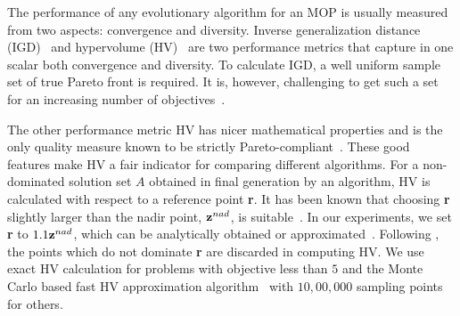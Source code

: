 \documentclass[review]{elsarticle}
\begin{document}
The performance of any evolutionary  algorithm for an MOP is usually measured from two aspects: convergence and diversity. Inverse generalization distance (IGD)~\citep{zitzler2003performance} and hypervolume (HV)~\citep{zitzler1999multiobjective} are two performance metrics that capture in one scalar both convergence and diversity. 
To calculate IGD, a well uniform sample set of true Pareto front is required. It is, however, challenging to get such a set for an increasing number of objectives~\citep{xinyao6883177}. %

The other performance metric HV has nicer mathematical properties  and is the only quality measure known to be strictly Pareto-compliant~\citep{zitzler2003performance}.
These good features make HV a fair indicator for comparing different algorithms. For a non-dominated solution set $A$ obtained in final generation by an algorithm, HV is calculated with respect to a reference point {\bf r}.
%
\noindent It has been known that choosing {\bf r} slightly larger than the nadir point, ${\bf z}^{nad}$, is suitable~\citep{ishibuchi2010many}. In our experiments, we set {\bf r} to $1.1{\bf z}^{nad}$, which can be analytically obtained or approximated~\citep{huband2006review}. 
Following \citep{wagner2007pareto}, the points which do not dominate {\bf r} are discarded in computing HV. 
We use exact HV calculation for problems with objective less than $5$ and the Monte Carlo based fast HV approximation algorithm~\citep{bader2011hype} with $10,00,000$ sampling points for others. %
\end{document}
